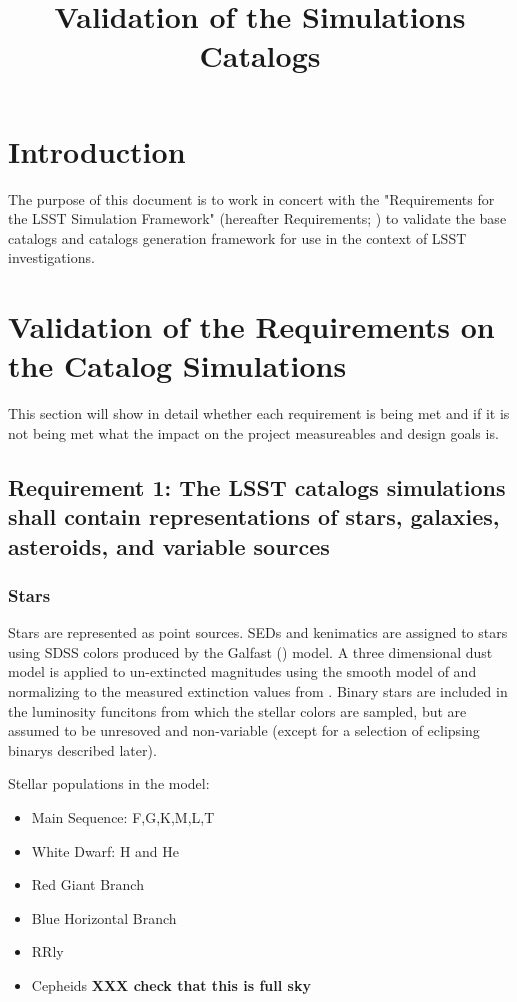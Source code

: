\documentclass[]{article}
\begin{document}
 
\sloppy
\title
{Validation of the Simulations Catalogs}


\label{firstpage}


\maketitle 
\section{Introduction \label{sec:intro}}
The purpose of this document is to work in concert with the "Requirements for the 
LSST Simulation Framework" (hereafter Requirements; \cite{requirements}) to validate the
base catalogs and catalogs generation framework for use in the context of
LSST investigations. 
\section{Validation of the Requirements on the Catalog Simulations}
This section will show in detail whether each requirement is being met and if it is not
being met what the impact on the project measureables and design goals is.
\subsection{Requirement 1: The LSST catalogs simulations shall contain representations of stars,
galaxies, asteroids, and variable sources}
\subsubsection{Stars}
Stars are represented as point sources.  SEDs and kenimatics are assigned to stars using SDSS colors produced by the Galfast (\cite{galfast})
model.  A three dimensional dust model is applied to un-extincted magnitudes using the smooth model of \cite{amores} and normalizing to the
measured extinction values from \cite{sfd}.  Binary stars are included in the luminosity funcitons from which the stellar colors are sampled,
but are assumed to be unresoved and non-variable (except for a selection of eclipsing binarys described later).

Stellar  populations in the model:
\begin{itemize}
\item Main Sequence: F,G,K,M,L,T
\item White Dwarf: H and He
\item Red Giant Branch
\item Blue Horizontal Branch
\item RRly
\item Cepheids {\bf XXX check that this is full sky}
\end{itemize}
\end{document}
